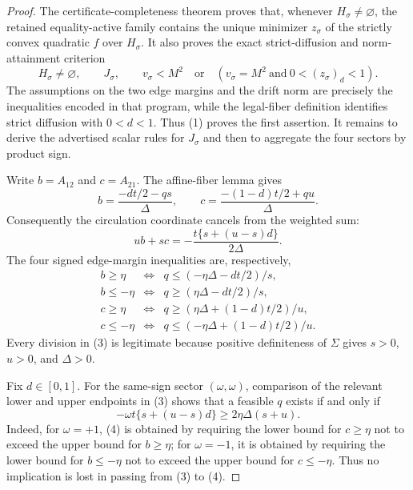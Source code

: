 \documentclass{article}
\begin{document}
\begin{proof}
The certificate-completeness theorem proves that, whenever \(H_{\sigma}\ne\varnothing\), the retained equality-active family contains the unique minimizer \(z_{\sigma}\) of the strictly convex quadratic \(f\) over \(H_{\sigma}\). It also proves the exact strict-diffusion and norm-attainment criterion
\[
H_{\sigma}\ne\varnothing,\qquad
J_{\sigma},\qquad
v_{\sigma}<M^2
\quad\text{or}\quad
\left(v_{\sigma}=M^2\ \text{and}\ 0<(z_{\sigma})_d<1\right). \tag{1}
\]
The assumptions on the two edge margins and the drift norm are precisely the inequalities encoded in that program, while the legal-fiber definition identifies strict diffusion with \(0<d<1\). Thus (1) proves the first assertion. It remains to derive the advertised scalar rules for \(J_{\sigma}\) and then to aggregate the four sectors by product sign.

Write \(b=A_{12}\) and \(c=A_{21}\). The affine-fiber lemma gives
\[
b=\frac{-dt/2-qs}{\Delta},
\qquad
c=\frac{-(1-d)t/2+qu}{\Delta}.
\]
Consequently the circulation coordinate cancels from the weighted sum:
\[
ub+sc
=-\frac{t\{s+(u-s)d\}}{2\Delta}. \tag{2}
\]
The four signed edge-margin inequalities are, respectively,
\[
\begin{array}{lll}
b\ge\eta &\Longleftrightarrow& q\le(-\eta\Delta-dt/2)/s,\\
b\le-\eta&\Longleftrightarrow& q\ge(\eta\Delta-dt/2)/s,\\
c\ge\eta &\Longleftrightarrow& q\ge(\eta\Delta+(1-d)t/2)/u,\\
c\le-\eta&\Longleftrightarrow& q\le(-\eta\Delta+(1-d)t/2)/u.
\end{array} \tag{3}
\]
Every division in (3) is legitimate because positive definiteness of \(\Sigma\) gives \(s>0\), \(u>0\), and \(\Delta>0\).

Fix \(d\in[0,1]\). For the same-sign sector \((\omega,\omega)\), comparison of the relevant lower and upper endpoints in (3) shows that a feasible \(q\) exists if and only if
\[
-\omega t\{s+(u-s)d\}\ge2\eta\Delta(s+u). \tag{4}
\]
Indeed, for \(\omega=+1\), (4) is obtained by requiring the lower bound for \(c\ge\eta\) not to exceed the upper bound for \(b\ge\eta\); for \(\omega=-1\), it is obtained by requiring the lower bound for \(b\le-\eta\) not to exceed the upper bound for \(c\le-\eta\). Thus no implication is lost in passing from (3) to (4).


\end{proof}
\end{document}
